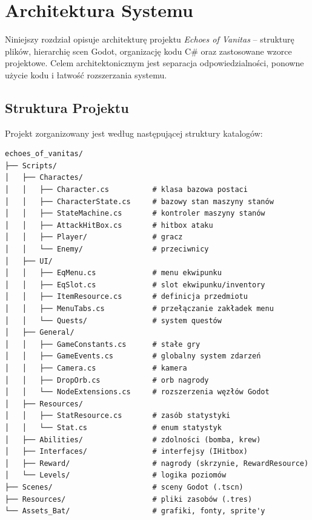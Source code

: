 \chapter{Architektura Systemu}

Niniejszy rozdział opisuje architekturę projektu \textit{Echoes of Vanitas} – strukturę plików, hierarchię scen Godot, organizację kodu C\# oraz zastosowane wzorce projektowe. Celem architektonicznym jest separacja odpowiedzialności, ponowne użycie kodu i łatwość rozszerzania systemu.

\section{Struktura Projektu}

Projekt zorganizowany jest według następującej struktury katalogów:

\begin{verbatim}
echoes_of_vanitas/
├── Scripts/
│   ├── Charactes/
│   │   ├── Character.cs          # klasa bazowa postaci
│   │   ├── CharacterState.cs     # bazowy stan maszyny stanów
│   │   ├── StateMachine.cs       # kontroler maszyny stanów
│   │   ├── AttackHitBox.cs       # hitbox ataku
│   │   ├── Player/               # gracz
│   │   └── Enemy/                # przeciwnicy
│   ├── UI/
│   │   ├── EqMenu.cs             # menu ekwipunku
│   │   ├── EqSlot.cs             # slot ekwipunku/inventory
│   │   ├── ItemResource.cs       # definicja przedmiotu
│   │   ├── MenuTabs.cs           # przełączanie zakładek menu
│   │   └── Quests/               # system questów
│   ├── General/
│   │   ├── GameConstants.cs      # stałe gry
│   │   ├── GameEvents.cs         # globalny system zdarzeń
│   │   ├── Camera.cs             # kamera
│   │   ├── DropOrb.cs            # orb nagrody
│   │   └── NodeExtensions.cs     # rozszerzenia węzłów Godot
│   ├── Resources/
│   │   ├── StatResource.cs       # zasób statystyki
│   │   └── Stat.cs               # enum statystyk
│   ├── Abilities/                # zdolności (bomba, krew)
│   ├── Interfaces/               # interfejsy (IHitbox)
│   ├── Reward/                   # nagrody (skrzynie, RewardResource)
│   └── Levels/                   # logika poziomów
├── Scenes/                       # sceny Godot (.tscn)
├── Resources/                    # pliki zasobów (.tres)
└── Assets_Bat/                   # grafiki, fonty, sprite'y
\end{verbatim}

